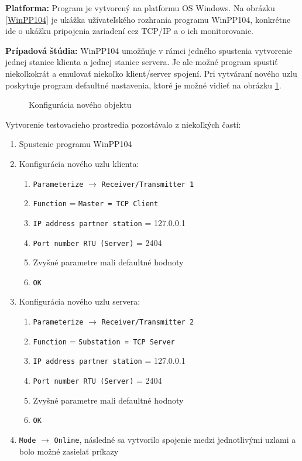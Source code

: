 \noindent \textbf{Platforma:} Program je vytvorený na platformu OS Windows. Na obrázku \ref{WinPP104} je ukážka užívateľského rozhrania programu WinPP104, konkrétne ide o ukážku pripojenia zariadení cez TCP/IP a o ich monitorovanie. \par
\noindent \textbf{Prípadová štúdia:} WinPP104 umožňuje v rámci jedného spustenia vytvorenie jednej stanice klienta a jednej stanice servera. Je ale možné program spustiť niekoľkokrát a emulovať niekoľko klient/server spojení. Pri vytváraní nového uzlu poskytuje program defaultné nastavenia, ktoré je možné vidieť na obrázku \ref{WinPP104Conf}.
\begin{figure}[h]
    \centering
    \caption{Konfigurácia nového objektu}
\label{WinPP104Conf}
\end{figure} \par
Vytvorenie testovacieho prostredia pozostávalo z niekoľkých častí:
\begin{enumerate}
\item Spustenie programu WinPP104
\item Konfigurácia nového uzlu klienta:
\begin{enumerate}
\item {\tt Parameterize} $\rightarrow$ {\tt Receiver/Transmitter 1}
\item {\tt Function} = {\tt Master = TCP Client}
\item {\tt IP address partner station} = 127.0.0.1
\item {\tt Port number RTU (Server)} = 2404
\item Zvyšné parametre mali defaultné hodnoty
\item {\tt OK}
\end{enumerate}
\item Konfigurácia nového uzlu servera:
\begin{enumerate}
\item {\tt Parameterize} $\rightarrow$ {\tt Receiver/Transmitter 2}
\item {\tt Function} = {\tt Substation = TCP Server}
\item {\tt IP address partner station} = 127.0.0.1
\item {\tt Port number RTU (Server)} = 2404
\item Zvyšné parametre mali defaultné hodnoty
\item {\tt OK}
\end{enumerate}
\item {\tt Mode} $\rightarrow$ {\tt Online}, následné sa vytvorilo spojenie medzi jednotlivými uzlami a bolo možné zasielať príkazy
\end{enumerate}
